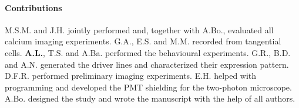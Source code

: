 \paragraph{Contributions}
M.S.M. and J.H. jointly performed and, together with A.Bo., evaluated all calcium imaging experiments. G.A., E.S. and M.M. recorded from tangential cells. \textbf{A.L.}, T.S. and A.Ba. performed the behavioural experiments. G.R., B.D. and A.N. generated the driver lines and characterized their expression pattern. D.F.R. performed preliminary imaging experiments. E.H. helped with programming and developed the PMT shielding for the two-photon microscope. A.Bo. designed the study and wrote the manuscript with the help of all authors.

\cleardoublepage


